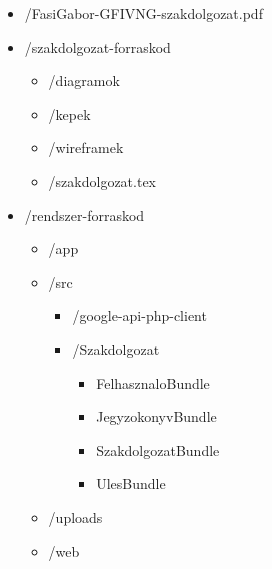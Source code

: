 \documentclass[a4paper,12pt,oneside]{report}
\begin{document}
\begin{itemize}
    \item[] /FasiGabor-GFIVNG-szakdolgozat.pdf
    \item[] /szakdolgozat-forraskod
    \begin{itemize}
        \item[] /diagramok
        \item[] /kepek
        \item[] /wireframek
        \item[] /szakdolgozat.tex
    \end{itemize}
    
    \item[] /rendszer-forraskod
    \begin{itemize}
        \item[] /app
        \item[] /src
        \begin{itemize}
            \item[] /google-api-php-client
            \item[] /Szakdolgozat
            \begin{itemize}
                \item[] FelhasznaloBundle
                \item[] JegyzokonyvBundle
                \item[] SzakdolgozatBundle
                \item[] UlesBundle
            \end{itemize}
        \end{itemize}
        
        \item[] /uploads
        \item[] /web
    \end{itemize}
    

\end{itemize}
\end{document}
